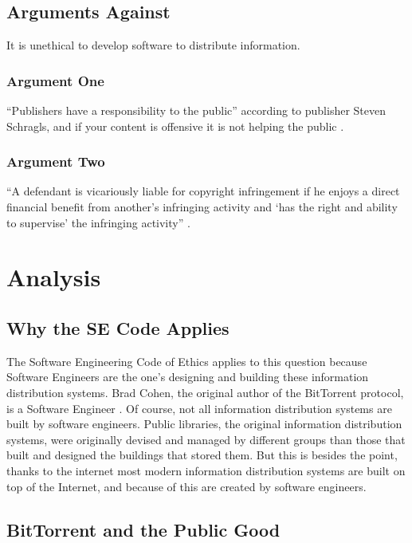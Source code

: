 \documentclass[11pt]{article}
\begin{document}
\subsection{Arguments Against}
It is unethical to develop software to distribute information.

\subsubsection{Argument One}

``Publishers have a responsibility to the public'' according to publisher Steven Schragls, and if your content is offensive it is not helping the public \cite[46]{hawker}.

\subsubsection{Argument Two}

``A defendant is vicariously liable for copyright infringement if he enjoys a direct financial benefit from another's infringing activity and `has the right and ability to supervise' the infringing activity'' \cite{2000m}.

\section{Analysis}

\subsection{Why the SE Code Applies}

The Software Engineering Code of Ethics applies to this question because Software Engineers are the one's designing and building these information distribution systems. Brad Cohen, the original author of the BitTorrent protocol, is a Software Engineer \cite{cohen}. Of course, not all information distribution systems are built by software engineers. Public libraries, the original information distribution systems, were originally devised and managed by different groups than those that built and designed the buildings that stored them. But this is besides the point, thanks to the internet most modern information distribution systems are built on top of the Internet, and because of this are created by software engineers.

\subsection{BitTorrent and the Public Good}
\end{document}
